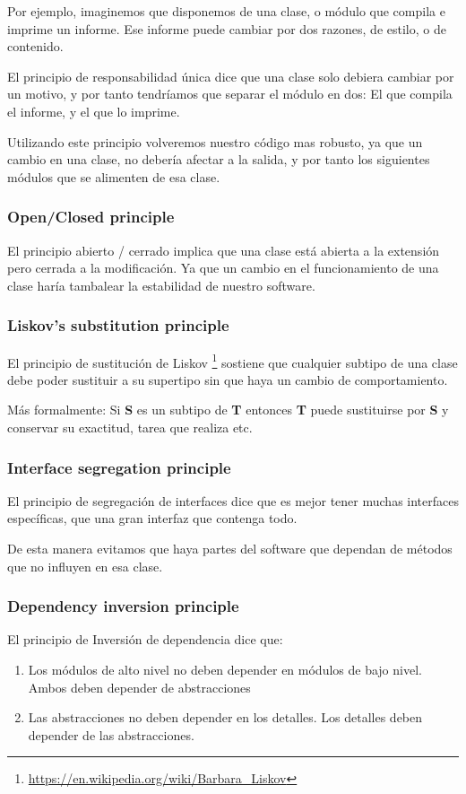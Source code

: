 Por ejemplo, imaginemos que disponemos de una clase, o m\'{o}dulo que compila e imprime un informe. Ese informe puede cambiar por dos razones,
de estilo, o de contenido. 

El principio de responsabilidad \'{u}nica dice que una clase solo debiera cambiar por un motivo, y por tanto tendr\'{i}amos que separar el m\'{o}dulo
en dos: El que compila el informe, y el que lo imprime.

Utilizando este principio volveremos nuestro c\'{o}digo mas robusto, ya que un cambio en una clase, no deber\'{i}a afectar a la salida, y por tanto
los siguientes m\'{o}dulos que se alimenten de esa clase.

\subsubsection{Open/Closed principle}
El principio abierto / cerrado implica que una clase est\'{a} abierta a la extensi\'{o}n pero cerrada a la modificaci\'{o}n. Ya que un cambio en el
funcionamiento de una clase har\'{i}a tambalear la estabilidad de nuestro software.

\subsubsection{Liskov's substitution principle}
El principio de sustituci\'{o}n de Liskov \footnote{\url{https://en.wikipedia.org/wiki/Barbara_Liskov}} sostiene que cualquier subtipo de una clase
debe poder sustituir a su supertipo sin que haya un cambio de comportamiento.

M\'{a}s formalmente: Si \textbf{S} es un subtipo de \textbf{T} entonces \textbf{T} puede sustituirse por \textbf{S} y 
conservar su exactitud, tarea que realiza etc.

\subsubsection{Interface segregation principle}
El principio de segregaci\'{o}n de interfaces dice que es mejor tener muchas interfaces espec\'{i}ficas, que una gran interfaz que contenga todo.

De esta manera evitamos que haya partes del software que dependan de m\'{e}todos que no influyen en esa clase.

\subsubsection{Dependency inversion principle}
El principio de Inversi\'{o}n de dependencia dice que:
\begin{enumerate}
    \item Los m\'{o}dulos de alto nivel no deben depender en m\'{o}dulos de bajo nivel. Ambos deben depender de abstracciones
    \item Las abstracciones no deben depender en los detalles. Los detalles deben depender de las abstracciones.
\end{enumerate}
